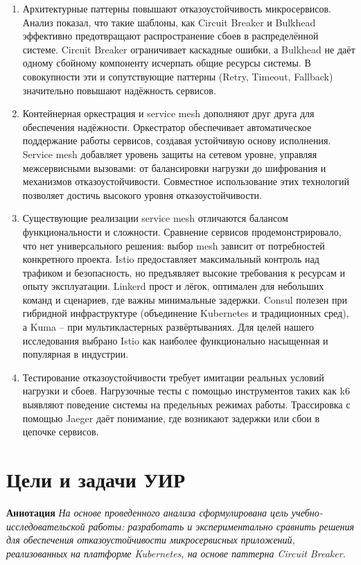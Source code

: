 \begin{enumerate}
    \item Архитектурные паттерны повышают отказоустойчивость микросервисов. Анализ показал, что такие шаблоны, как Circuit Breaker и Bulkhead эффективно предотвращают распространение сбоев в распределённой системе. Circuit Breaker ограничивает каскадные ошибки, а Bulkhead не даёт одному сбойному компоненту исчерпать общие ресурсы системы. В совокупности эти и сопутствующие паттерны (Retry, Timeout, Fallback) значительно повышают надёжность сервисов.

    \item Контейнерная оркестрация и service mesh дополняют друг друга для обеспечения надёжности. Оркестратор обеспечивает автоматическое поддержание работы сервисов, создавая устойчивую основу исполнения. Service mesh добавляет уровень защиты на сетевом уровне, управляя межсервисными вызовами: от балансировки нагрузки до шифрования и механизмов отказоустойчивости. Совместное использование этих технологий позволяет достичь высокого уровня отказоустойчивости.

    \item Существующие реализации service mesh отличаются балансом функциональности и сложности. Сравнение сервисов продемонстрировало, что нет универсального решения: выбор mesh зависит от потребностей конкретного проекта. Istio предоставляет максимальный контроль над трафиком и безопасность, но предъявляет высокие требования к ресурсам и опыту эксплуатации. Linkerd прост и лёгок, оптимален для небольших команд и сценариев, где важны минимальные задержки. Consul полезен при гибридной инфраструктуре (объединение Kubernetes и традиционных сред), а Kuma – при мультикластерных развёртываниях. Для целей нашего исследования выбрано Istio как наиболее функционально насыщенная и популярная в индустрии.

    \item Тестирование отказоустойчивости требует имитации реальных условий нагрузки и сбоев. Нагрузочные тесты с помощью инструментов таких как k6 выявляют поведение системы на предельных режимах работы. Трассировка с помощью Jaeger даёт понимание, где возникают задержки или сбои в цепочке сервисов. 

\end{enumerate}
\section{Цели и задачи УИР}

\textbf{Аннотация} \textit{На основе проведенного анализа сформулирована цель учебно-исследовательской работы: разработать и экспериментально сравнить решения для обеспечения отказоустойчивости микросервисных приложений, реализованных на платформе Kubernetes, на основе паттерна Circuit Breaker.} 


